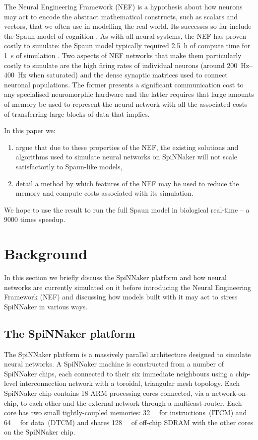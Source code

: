 \documentclass[conference]{IEEEtran}
\begin{document}
The Neural Engineering Framework (NEF) \parencite{Eliasmith2004} is a hypothesis about how neurons may act to encode the abstract mathematical constructs, such as scalars and vectors, that we often use in modelling the real world.
Its successes so far include the Spaun model of cognition \parencite{Eliasmith2012}.
As with all neural systems, the NEF has proven costly to simulate: the Spaun model typically required \SI{2.5}{\hour} of compute time for \SI{1}{\second} of simulation \parencite[\S V]{Stewart2014}.
Two aspects of NEF networks that make them particularly costly to simulate are the high firing rates of individual neurons (around \SIrange{200}{400}{\hertz} when saturated) and the dense synaptic matrices used to connect neuronal populations.
The former presents a significant communication cost to any specialised neuromorphic hardware and the latter requires that large amounts of memory be used to represent the neural network with all the associated costs of transferring large blocks of data that implies.

  In this paper we:
  \begin{enumerate}
    \item argue that due to these properties of the NEF, the existing solutions and algorithms used to simulate neural networks on SpiNNaker will not scale satisfactorily to Spaun-like models,
    \item detail a method by which features of the NEF may be used to reduce the memory and compute costs associated with its simulation.
  \end{enumerate}

We hope to use the result to run the full Spaun model in biological real-time -- a \num{9000} times speedup.

  \section{Background}

In this section we briefly discuss the SpiNNaker platform and how neural networks are currently simulated on it before introducing the Neural Engineering Framework (NEF) and discussing how models built with it may act to stress SpiNNaker in various ways.

  \subsection{The SpiNNaker platform}

The SpiNNaker platform is a massively parallel architecture designed to simulate neural networks.
A SpiNNaker machine is constructed from a number of SpiNNaker chips, each connected to their six immediate neighbours using a chip-level interconnection network with a toroidal, triangular mesh topology.
Each SpiNNaker chip contains 18 ARM processing cores connected, via a network-on-chip, to each other and the external network through a multicast router.
Each core has two small tightly-coupled memories: \SI{32}{\kibi\byte} for instructions~(ITCM) and \SI{64}{\kibi\byte} for data~(DTCM) and shares \SI{128}{\mebi\byte} of off-chip SDRAM with the other cores on the SpiNNaker chip.
\end{document}
